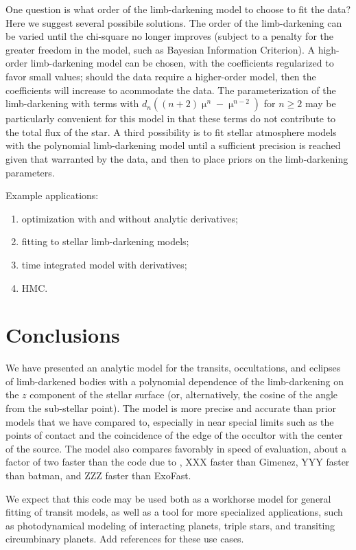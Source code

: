 \documentclass[modern]{aastex61}
\begin{document}
One question is what order of the limb-darkening model to choose to
fit the data?  Here we suggest several possibile solutions.  The order of the
limb-darkening can be varied until the chi-square no longer improves (subject
to a penalty for the greater freedom in the model, such as Bayesian Information
Criterion).  A high-order limb-darkening model can be chosen, with the
coefficients regularized to favor small values;  should the data require
a higher-order model, then the coefficients will increase to acommodate
the data.  The parameterization of the limb-darkening with terms with
$d_n ((n+2)\upmu^n-\upmu^{n-2})$ for $n \ge 2$ may be particularly
convenient for this model in that these terms do not contribute to the
total flux of the star.  A third possibility is to fit stellar atmosphere
models with the polynomial limb-darkening model until a sufficient precision
is reached given that warranted by the data, and then to place priors
on the limb-darkening parameters.

Example applications:  
\begin{enumerate}
\item optimization with and without analytic derivatives;
\item fitting to stellar limb-darkening models;
\item time integrated model with derivatives;
\item HMC.
\end{enumerate}

\section{Conclusions}

We have presented an analytic model for the transits, occultations, and
eclipses of limb-darkened bodies with a polynomial dependence of the limb-darkening
on the $z$ component of the stellar surface (or, alternatively, the
cosine of the angle from the sub-stellar point).  The model is more precise
and accurate than prior models that we have compared to, especially in near 
special limits such as the points of contact and the coincidence of the edge 
of the occultor with the center of the source.  The model also compares favorably in
speed of evaluation, about a factor of two faster than the code due
to \citet{Pal2008}, XXX faster than Gimenez, YYY faster than batman,
and ZZZ faster than ExoFast.

We expect that this code may be used both as a workhorse model for
general fitting of transit models, as well as a tool for more 
specialized applications, such as photodynamical modeling of
interacting planets, triple stars, and transiting circumbinary planets.
{\color{red} Add references for these use cases.}
\end{document}
